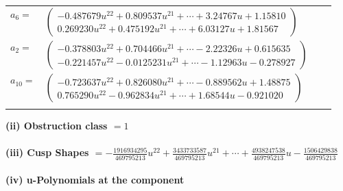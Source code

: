 \documentclass[1p]{elsarticle_modified}
\theoremstyle{definition}
\begin{document}
\begin{tabular}{m{7pt} m{180pt} m{7pt} m{180pt} }
\flushright $a_{6}=$&$\begin{pmatrix}-0.487679 u^{22}+0.809537 u^{21}+\cdots+3.24767 u+1.15810\\0.269230 u^{22}+0.475192 u^{21}+\cdots+6.03127 u+1.81567\end{pmatrix}$ \\
\flushright $a_{2}=$&$\begin{pmatrix}-0.378803 u^{22}+0.704466 u^{21}+\cdots-2.22326 u+0.615635\\-0.221457 u^{22}-0.0125231 u^{21}+\cdots-1.12963 u-0.278927\end{pmatrix}$ \\
\flushright $a_{10}=$&$\begin{pmatrix}-0.723637 u^{22}+0.826080 u^{21}+\cdots-0.889562 u+1.48875\\0.765290 u^{22}-0.962834 u^{21}+\cdots+1.68544 u-0.921020\end{pmatrix}$\\&\end{tabular}
\flushleft \textbf{(ii) Obstruction class $= 1$}\\~\\
\flushleft \textbf{(iii) Cusp Shapes $= -\frac{1916934295}{469795213} u^{22}+\frac{3433733587}{469795213} u^{21}+\cdots+\frac{4938247538}{469795213} u-\frac{1506429838}{469795213}$}\\~\\
\newpage\renewcommand{\arraystretch}{1}
\flushleft \textbf{(iv) u-Polynomials at the component}\newline \\
\end{document}
